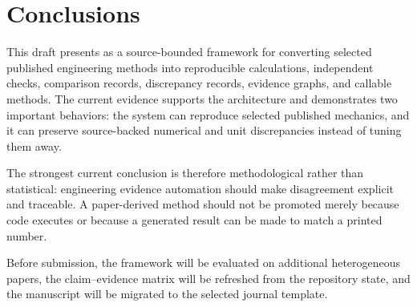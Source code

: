 \section{Conclusions}
This draft presents \engiproof{} as a source-bounded framework for converting selected published engineering methods into reproducible calculations, independent checks, comparison records, discrepancy records, evidence graphs, and callable methods. The current evidence supports the architecture and demonstrates two important behaviors: the system can reproduce selected published mechanics, and it can preserve source-backed numerical and unit discrepancies instead of tuning them away.

The strongest current conclusion is therefore methodological rather than statistical: engineering evidence automation should make disagreement explicit and traceable. A paper-derived method should not be promoted merely because code executes or because a generated result can be made to match a printed number.

Before submission, the framework will be evaluated on additional heterogeneous papers, the claim--evidence matrix will be refreshed from the repository state, and the manuscript will be migrated to the selected journal template.
